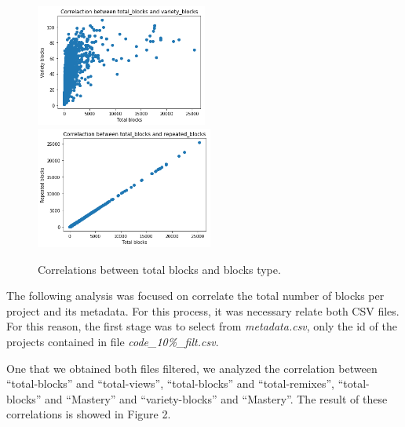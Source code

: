 \documentclass[a4paper,twocolumn,10pt]{article}
\begin{document}
\begin{figure}
\includegraphics[height=4cm]{1.png}
\includegraphics[height=4cm]{2.png}
\caption{Correlations between total blocks and blocks type.}
\end{figure}

The following analysis was focused on correlate the total number of blocks per project
and its metadata. For this process, it was necessary relate both CSV files. For this
reason, the first stage was to select from \textit{metadata.csv}, only the id of the
projects contained in file \textit{code\_10\%\_filt.csv}.\par
One that we obtained both files filtered, we analyzed the correlation between 
``total-blocks'' and ``total-views'', ``total-blocks'' and ``total-remixes'', 
``total-blocks'' and ``Mastery'' and ``variety-blocks'' and ``Mastery''. The result
of these correlations is showed in Figure 2.\par
\end{document}
